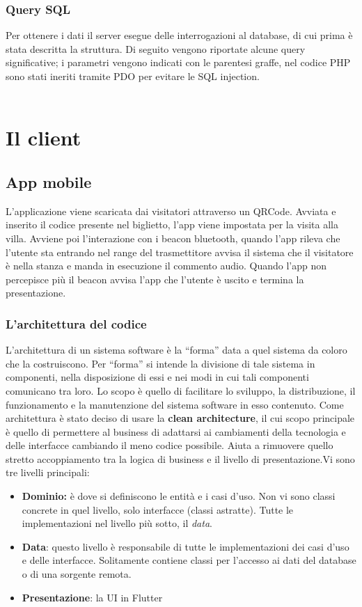 \documentclass[12pt]{article}
\begin{document}
\subsubsection{Query SQL}
Per ottenere i dati il server esegue delle interrogazioni al database, di cui prima è stata descritta la struttura. Di seguito vengono riportate alcune query significative; i parametri vengono indicati con le parentesi graffe, nel codice PHP sono stati ineriti tramite PDO per evitare le SQL injection.\\\\

\section{Il client}
\subsection{App mobile}
L'applicazione viene scaricata dai visitatori attraverso un QRCode. Avviata
e inserito il codice presente nel biglietto, l’app viene impostata per la visita alla villa. Avviene poi l'interazione con i beacon bluetooth, quando l’app rileva che l'utente sta entrando nel range del trasmettitore avvisa il sistema che il visitatore è nella stanza e manda in esecuzione il commento audio. Quando l’app non percepisce più il beacon avvisa l’app che l’utente è uscito e termina la presentazione.

\subsubsection{L'architettura del codice}
L’architettura di un sistema software è la “forma” data a quel sistema da coloro che la costruiscono. Per  “forma” si intende la divisione di tale sistema in componenti, nella disposizione di essi e nei modi in cui tali componenti comunicano tra loro. Lo scopo è  quello di facilitare lo sviluppo, la distribuzione, il funzionamento e la manutenzione del sistema software in esso contenuto.\cite{architettura_codice}
Come architettura è stato deciso di usare la \textbf{clean architecture}, il cui scopo principale è quello di permettere al business di adattarsi ai cambiamenti della tecnologia e delle interfacce cambiando il meno codice possibile. Aiuta a rimuovere quello stretto accoppiamento tra la logica di business e il livello di presentazione.\cite{architettura_introduction}\clearpage Vi sono tre livelli principali:
\begin{itemize}
    \item \textbf{Dominio:} è dove si definiscono le entità e i casi d'uso. Non vi sono classi concrete in quel livello, solo interfacce (classi astratte). Tutte le implementazioni nel livello più sotto, il \emph{data}. 
    \item \textbf{Data}: questo livello è responsabile di tutte le implementazioni dei casi d'uso e delle interfacce. Solitamente contiene classi per l'accesso ai dati del database o di una sorgente remota.
    \item \textbf{Presentazione}: la UI in Flutter
\end{itemize}
\end{document}
